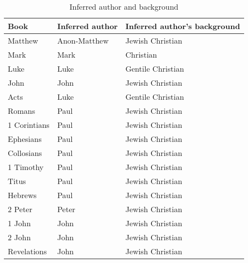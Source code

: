 \documentclass{article}
\begin{document}
\begin{table}
    \centering
    \renewcommand\arraystretch{1.3}
    \begin{tabular}{@{}lll@{}}
    \toprule
        Book & Inferred author & Inferred author's background\\
    \midrule
        Matthew & Anon-Matthew & Jewish Christian~\cite{Duling2010} \\
        Mark & Mark & Christian~\cite{Schroter2010} \\
        Luke & Luke & Gentile Christian \\
        John & John & Jewish Christian \\
        Acts & Luke & Gentile Christian \\
        Romans & Paul & Jewish Christian \\
        1 Corintians & Paul & Jewish Christian \\
        Ephesians & Paul & Jewish Christian \\
        Collosians & Paul & Jewish Christian \\
        1 Timothy & Paul & Jewish Christian \\
        Titus & Paul & Jewish Christian \\
        Hebrews & Paul & Jewish Christian \\
        2 Peter & Peter & Jewish Christian \\
        1 John & John & Jewish Christian \\
        2 John & John & Jewish Christian \\
        Revelations & John & Jewish Christian \\
    \bottomrule
    \end{tabular}
    \caption{Inferred author and background}
    \label{author}
\end{table}
\end{document}
